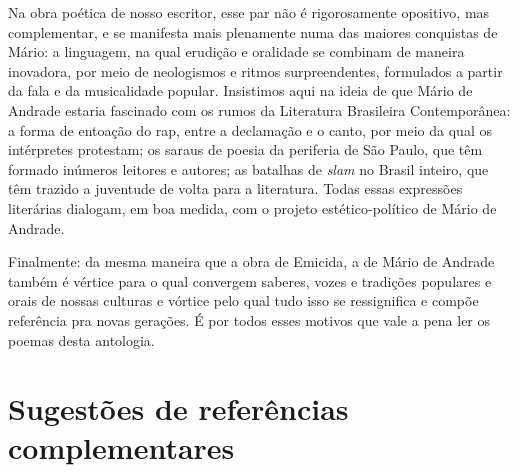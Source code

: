 \documentclass[11pt]{extarticle}
\begin{document}
Na obra poética de nosso escritor, esse par não é rigorosamente
opositivo, mas complementar, e se manifesta mais plenamente numa das
maiores conquistas de Mário: a linguagem, na qual erudição e oralidade
se combinam de maneira inovadora, por meio de neologismos e ritmos
surpreendentes, formulados a partir da fala e da musicalidade popular.
Insistimos aqui na ideia de que Mário de Andrade estaria fascinado com
os rumos da Literatura Brasileira Contemporânea: a forma de entoação do
rap, entre a declamação e o canto, por meio da qual os intérpretes
protestam; os saraus de poesia da periferia de São Paulo, que têm
formado inúmeros leitores e autores; as batalhas de \emph{slam} no
Brasil inteiro, que têm trazido a juventude de volta para a literatura.
Todas essas expressões literárias dialogam, em boa medida, com o projeto
estético-político de Mário de Andrade.

Finalmente: da mesma maneira que a obra de Emicida, a de Mário de
Andrade também é vértice para o qual convergem saberes, vozes e
tradições populares e orais de nossas culturas e vórtice pelo qual tudo
isso se ressignifica e compõe referência pra novas gerações. É por todos
esses motivos que vale a pena ler os poemas desta antologia.

\section{Sugestões de referências complementares}
\end{document}
